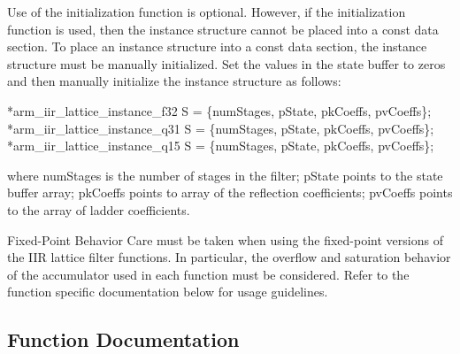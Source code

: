 \begin{DoxyParagraph}{}
Use of the initialization function is optional. However, if the initialization function is used, then the instance structure cannot be placed into a const data section. To place an instance structure into a const data section, the instance structure must be manually initialized. Set the values in the state buffer to zeros and then manually initialize the instance structure as follows\+: 
\begin{DoxyPre}
*arm\_iir\_lattice\_instance\_f32 S = \{numStages, pState, pkCoeffs, pvCoeffs\};
*arm\_iir\_lattice\_instance\_q31 S = \{numStages, pState, pkCoeffs, pvCoeffs\};
*arm\_iir\_lattice\_instance\_q15 S = \{numStages, pState, pkCoeffs, pvCoeffs\};
  \end{DoxyPre}
 
\end{DoxyParagraph}
\begin{DoxyParagraph}{}
where {\ttfamily num\+Stages} is the number of stages in the filter; {\ttfamily p\+State} points to the state buffer array; {\ttfamily pk\+Coeffs} points to array of the reflection coefficients; {\ttfamily pv\+Coeffs} points to the array of ladder coefficients. 
\end{DoxyParagraph}
\begin{DoxyParagraph}{Fixed-\/\+Point Behavior}
Care must be taken when using the fixed-\/point versions of the I\+IR lattice filter functions. In particular, the overflow and saturation behavior of the accumulator used in each function must be considered. Refer to the function specific documentation below for usage guidelines. 
\end{DoxyParagraph}


\subsection{Function Documentation}
